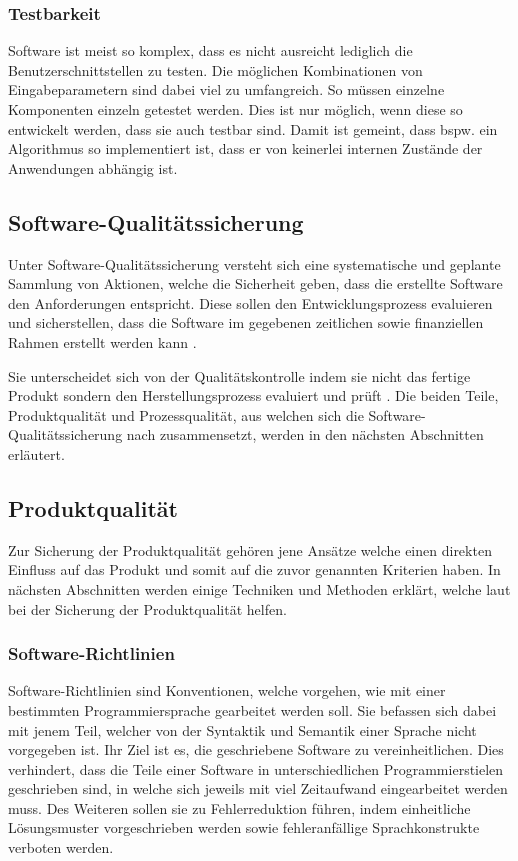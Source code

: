 \subsubsection{Testbarkeit}
Software ist meist so komplex, dass es nicht ausreicht lediglich die Benutzerschnittstellen zu testen.
Die möglichen Kombinationen von Eingabeparametern sind dabei viel zu umfangreich.
So müssen einzelne Komponenten einzeln getestet werden.
Dies ist nur möglich, wenn diese so entwickelt werden, dass sie auch testbar sind.
Damit ist gemeint, dass bspw. ein Algorithmus so implementiert ist, dass er von keinerlei internen Zustände der Anwendungen abhängig ist. 


\subsection{Software-Qualitätssicherung}\label{qualisicherung}
Unter Software-Qualitätssicherung versteht sich eine systematische und geplante Sammlung von Aktionen, 
welche die Sicherheit geben, dass die erstellte Software den Anforderungen entspricht.
Diese sollen den Entwicklungsprozess evaluieren und sicherstellen,
dass die Software im gegebenen zeitlichen sowie finanziellen Rahmen erstellt werden kann \parencite{galin2004software}. 

Sie unterscheidet sich von der Qualitätskontrolle indem sie nicht das fertige Produkt sondern den Herstellungsprozess evaluiert und prüft \parencite{galin2004software}.
Die beiden Teile, Produktqualität und Prozessqualität, aus welchen sich die Software-Qualitätssicherung nach \citeauthor{hoffmann2013software} zusammensetzt, werden in den nächsten Abschnitten erläutert.

\subsection{Produktqualität}
Zur Sicherung der Produktqualität gehören jene Ansätze welche einen direkten Einfluss auf das Produkt und somit auf die zuvor genannten Kriterien haben.
In nächsten Abschnitten werden einige Techniken und Methoden erklärt, welche laut \citeauthor{hoffmann2013software} bei der Sicherung der Produktqualität helfen.

\subsubsection{Software-Richtlinien}
Software-Richtlinien sind Konventionen, welche vorgehen, wie mit einer bestimmten Programmiersprache gearbeitet werden soll.
Sie befassen sich dabei mit jenem Teil, welcher von der Syntaktik und Semantik einer Sprache nicht vorgegeben ist.
Ihr Ziel ist es, die geschriebene Software zu vereinheitlichen.
Dies verhindert, dass die Teile einer Software in unterschiedlichen Programmierstielen geschrieben sind, in welche sich jeweils mit viel Zeitaufwand eingearbeitet werden muss.
Des Weiteren sollen sie zu Fehlerreduktion führen, indem einheitliche Lösungsmuster vorgeschrieben werden sowie fehleranfällige Sprachkonstrukte verboten werden.


